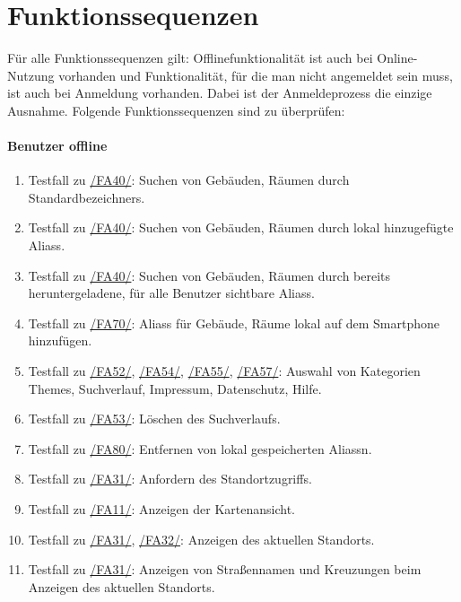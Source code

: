 \section{Funktionssequenzen}

Für alle Funktionssequenzen gilt:
Offlinefunktionalität ist auch bei Online-Nutzung vorhanden und Funktionalität, für die man nicht angemeldet sein muss, ist auch bei Anmeldung vorhanden. Dabei ist der Anmeldeprozess die einzige Ausnahme.
Folgende Funktionssequenzen sind zu überprüfen:

\paragraph{\Gls{Benutzer} offline}
\begin{enumerate}[label=\textbf{/T\arabic*0/}, align=left]
	\item \label{/T10/} Testfall zu \hyperref[/FA40/]{/FA40/}: Suchen von Gebäuden, Räumen durch \Glspl{Standardbezeichner}.
	\item \label{/T20/} Testfall zu \hyperref[/FA40/]{/FA40/}: Suchen von Gebäuden, Räumen durch \gls{lokal} hinzugefügte \Glspl{Alias}.
	\item \label{/T30/} Testfall zu \hyperref[/FA40/]{/FA40/}: Suchen von Gebäuden, Räumen durch bereits heruntergeladene, für alle Benutzer sichtbare \Glspl{Alias}.
	\item \label{/T40/} Testfall zu \hyperref[/FA70/]{/FA70/}: \Glspl{Alias} für Gebäude, Räume \gls{lokal} auf dem Smartphone hinzufügen.
	\item \label{/T50/} Testfall zu \hyperref[/FA52/]{/FA52/}, \hyperref[/FA54/]{/FA54/}, \hyperref[/FA55/]{/FA55/}, \hyperref[/FA57/]{/FA57/}: Auswahl von Kategorien \Glspl{Theme}, Suchverlauf, Impressum, Datenschutz, Hilfe.
	\item \label{/T60/} Testfall zu \hyperref[/FA53/]{/FA53/}: Löschen des Suchverlaufs.
	\item \label{/T70/} Testfall zu \hyperref[/FA80/]{/FA80/}: Entfernen von \gls{lokal} gespeicherten \Glspl{Alias}n.
	\item \label{/T80/} Testfall zu \hyperref[/FA31/]{/FA31/}: Anfordern des Standortzugriffs.
	\item \label{/T90/} Testfall zu \hyperref[/FA11/]{/FA11/}: Anzeigen der \Gls{Kartenansicht}.
	\item \label{/T100/} Testfall zu \hyperref[/FA31/]{/FA31/}, \hyperref[/FA32/]{/FA32/}: Anzeigen des aktuellen Standorts.
	\item \label{/T110/} Testfall zu \hyperref[/FA31/]{/FA31/}: Anzeigen von Straßennamen und Kreuzungen beim Anzeigen des aktuellen Standorts.

\end{enumerate}

